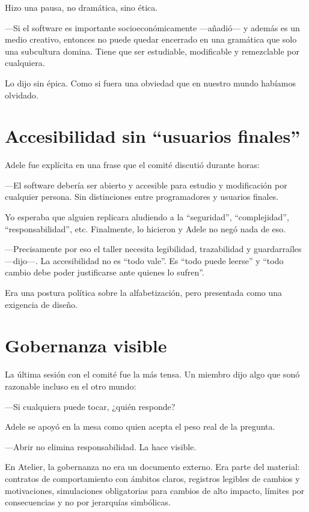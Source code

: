 \documentclass[11pt,a4paper]{article}
\begin{document}
Hizo una pausa, no dramática, sino ética.

---Si el software es importante socioeconómicamente ---añadió--- y además es
un medio creativo, entonces no puede quedar encerrado en una gramática que
solo una subcultura domina. Tiene que ser estudiable, modificable y
remezclable por cualquiera.

Lo dijo sin épica. Como si fuera una obviedad que en nuestro mundo habíamos
olvidado.

\section{Accesibilidad sin ``usuarios finales''}

Adele fue explícita en una frase que el comité discutió durante horas:

---El software debería ser abierto y accesible para estudio y modificación por
cualquier persona. Sin distinciones entre programadores y usuarios finales.

Yo esperaba que alguien replicara aludiendo a la ``seguridad'',
``complejidad'', ``responsabilidad'', etc. Finalmente, lo hicieron y Adele no
negó nada de eso.

---Precisamente por eso el taller necesita legibilidad, trazabilidad y
guardarraíles ---dijo---. La accesibilidad no es ``todo vale''. Es ``todo
puede leerse'' y ``todo cambio debe poder justificarse ante quienes lo
sufren''.

Era una postura política sobre la alfabetización, pero presentada como una
exigencia de diseño.

\section{Gobernanza visible}

La última sesión con el comité fue la más tensa. Un miembro dijo algo que sonó
razonable incluso en el otro mundo:

---Si cualquiera puede tocar, ¿quién responde?

Adele se apoyó en la mesa como quien acepta el peso real de la pregunta.

---Abrir no elimina responsabilidad. La hace visible.

En Atelier, la gobernanza no era un documento externo. Era parte del material:
contratos de comportamiento con ámbitos claros, registros legibles de cambios
y motivaciones, simulaciones obligatorias para cambios de alto impacto,
límites por consecuencias y no por jerarquías simbólicas.
\end{document}
